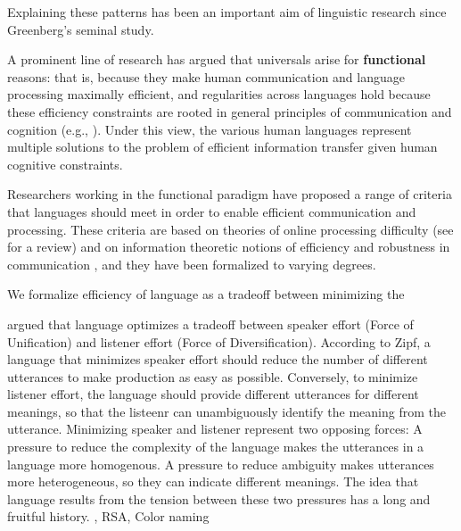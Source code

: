\documentclass[9pt,twocolumn,twoside,lineno]{pnas-new}
\newcommand{\key}[1]{\textbf{#1}}
\begin{document}

Explaining these patterns has been an important aim of linguistic research since Greenberg's seminal study.



A prominent line of research has argued that universals arise for \key{functional} reasons: that is, because they make human communication and language processing maximally efficient, and regularities across languages hold because these efficiency constraints are rooted in general principles of communication and cognition (e.g., \cite{gabelentz1901sprachwissenschaft,zipf1949human,hockett1960origin,givon1991markedness,hawkins1994performance,hawkins2004efficiency,hawkins2014crosslinguistic,croft2001functional,haspelmath2008parametric,jaeger2011language}).
Under this view, the various human languages represent multiple solutions to the problem of efficient information transfer given human cognitive constraints.

Researchers working in the functional paradigm have proposed a range of criteria that languages should meet in order to enable efficient communication and processing. These criteria are based on theories of online processing difficulty (see \cite{jaeger2011language} for a review) and on information theoretic notions of efficiency and robustness in communication \cite{ferrericancho2001two,piantadosi2011word,gibson2013noisy}, and they have been formalized to varying degrees. 



We formalize efficiency of language as a tradeoff between minimizing the 




\cite{zipf1949human} argued that language optimizes a tradeoff between speaker effort (Force of Unification) and listener effort (Force of Diversification).
According to Zipf, a language that minimizes speaker effort should reduce the number of different utterances to make production as easy as possible.
Conversely, to minimize listener effort, the language should provide different utterances for different meanings, so that the listeenr can unambiguously identify the meaning from the utterance.
Minimizing speaker and listener represent two opposing forces:
A pressure to reduce the complexity of the language makes the utterances in a language more homogenous.
A pressure to reduce ambiguity makes utterances more heterogeneous, so they can indicate different meanings.
The idea that language results from the tension between these two pressures has a long and fruitful history.
\cite{horn-toward-1984}, RSA, Color naming
\end{document}
